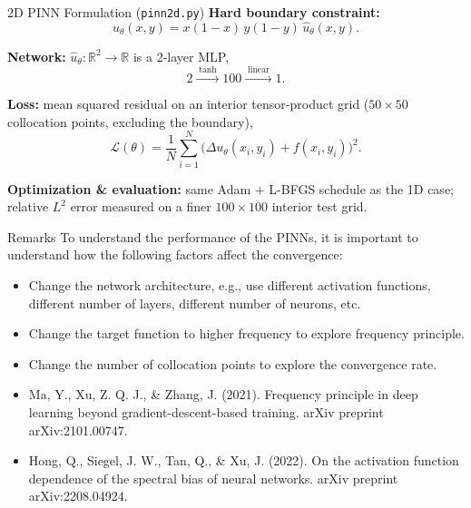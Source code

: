 \documentclass[10pt]{beamer}
\begin{document}
\begin{frame}{2D PINN Formulation (\texttt{pinn2d.py})}
	\textbf{Hard boundary constraint:}
	\[
		u_\theta(x,y) = x(1-x)\,y(1-y)\,\widehat{u}_\theta(x,y).
	\]

	\vspace{0.4em}
	\textbf{Network:} $\widehat{u}_\theta \colon \mathbb{R}^2\to\mathbb{R}$ is a 2-layer MLP,
	\[
		2 \xrightarrow{\;\tanh\;} 100 \xrightarrow{\;\mathrm{linear}\;} 1.
	\]

	\vspace{0.4em}
	\textbf{Loss:} mean squared residual on an interior tensor-product grid
	($50\times 50$ collocation points, excluding the boundary),
	\[
		\mathcal{L}(\theta)
		= \frac{1}{N}\sum_{i=1}^{N}
		\bigl(\Delta u_\theta(x_i,y_i) + f(x_i,y_i)\bigr)^2.
	\]

	\vspace{0.4em}
	\textbf{Optimization \& evaluation:} same Adam + L-BFGS schedule as the 1D case;
	relative $L^2$ error measured on a finer $100\times 100$ interior test grid.
\end{frame}

\begin{frame}{Remarks}
To understand the performance of the PINNs, it is important to understand how the following factors affect the convergence:  
\begin{itemize}
	\item Change the network architecture, e.g., use different activation functions, different number of layers, different number of neurons, etc.
	\item Change the target function to higher frequency to explore frequency principle. 
	\item Change the number of collocation points to explore the convergence rate.
\end{itemize}
\vfill 
\begin{itemize}
	\scriptsize
	\item Ma, Y., Xu, Z. Q. J., \& Zhang, J. (2021). Frequency principle in deep learning beyond gradient-descent-based training. arXiv preprint arXiv:2101.00747.
	\item Hong, Q., Siegel, J. W., Tan, Q., \& Xu, J. (2022). On the activation function dependence of the spectral bias of neural networks. arXiv preprint arXiv:2208.04924.
\end{itemize}
\end{frame}
\end{document}
